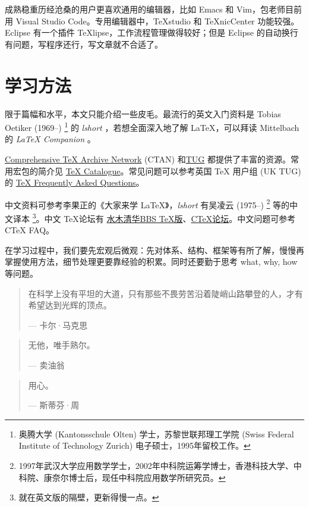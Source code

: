 成熟稳重历经沧桑的用户更喜欢通用的编辑器，比如 Emacs 和 Vim，包老师目前用 Visual Studio Code。专用编辑器中，TeXstudio 和 TeXnicCenter 功能较强。Eclipse 有一个插件 TeXlipse，工作流程管理做得较好；但是 Eclipse 的自动换行有问题，写程序还行，写文章就不合适了。

\section{学习方法}

限于篇幅和水平，本文只能介绍一些皮毛。最流行的英文入门资料是 Tobias Oetiker (1969--)\indexOetiker{} \footnote{奥腾大学 (Kantonsschule Olten) 学士，苏黎世联邦理工学院 (Swiss Federal Institute of Technology Zurich) 电子硕士，1995年留校工作。} 的 \emph{lshort} \citep{Oetiker_lshort}，若想全面深入地了解 \LaTeX ，可以拜读 Mittelbach 的 \emph{\LaTeX{} Companion} \citep{Mittelbach_latex_comp}。

\href{http://www.ctan.org/}{Comprehensive TeX Archive Network} (CTAN) 和\href{http://www.tug.org/}{TUG} 都提供了丰富的资源。常用宏包的简介见 \href{http://www.ctan.org/tex-archive/help/Catalogue/catalogue.html}{TeX Catalogue}。常见问题可以参考英国 TeX 用户组 (UK TUG) 的 \href{http://www.tex.ac.uk/faq/}{TeX Frequently Asked Questions}。

中文资料可参考李果正\indexLee 的《大家来学 \LaTeX 》\citep{Lee_latex}，\emph{lshort} 有吴凌云 (1975--)\indexWuLingyun{} \footnote{1997年武汉大学应用数学学士，2002年中科院运筹学博士，香港科技大学、中科院、康奈尔博士后，现任中科院应用数学所研究员。} 等的中文译本 \footnote{就在英文版的隔壁，更新得慢一点。}。中文 \TeX 论坛有 \href{http://www.smth.org/bbsdoc.php?board=TeX}{水木清华BBS TeX版}、\href{http://bbs.ctex.org/}{CTeX论坛}。中文问题可参考 CTeX FAQ\citep{CTeX_faq}。

在学习过程中，我们要先宏观后微观：先对体系、结构、框架等有所了解，慢慢再掌握使用方法，细节处理更要靠经验的积累。同时还要勤于思考 what, why, how 等问题。

\begin{quotation}
在科学上没有平坦的大道，只有那些不畏劳苦沿着陡峭山路攀登的人，才有希望达到光辉的顶点。
\begin{flushright}
--- 卡尔·马克思
\end{flushright}
\end{quotation}

\begin{quotation}
无他，唯手熟尔。
\begin{flushright}
--- 卖油翁
\end{flushright}
\end{quotation}

\begin{quotation}
用心。
\begin{flushright}
--- 斯蒂芬·周
\end{flushright}
\end{quotation}



